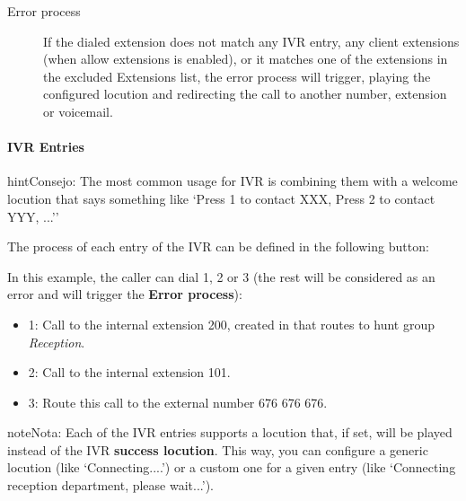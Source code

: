 \documentclass[letterpaper,10pt,spanish]{sphinxmanual}
\begin{document}
\begin{description}
\item[{Error process}] \leavevmode{}\label{administration_portal/client/vpbx/routing_endpoints/ivrs:term-error-process}
If the dialed extension does not match any IVR entry, any client extensions
(when allow extensions is enabled), or it matches one of the extensions in the
excluded Extensions list, the error process will trigger, playing the configured
locution and redirecting the call to another number, extension or voicemail.

\end{description}


\paragraph{IVR Entries}
\label{administration_portal/client/vpbx/routing_endpoints/ivrs:ivr-entries}
\begin{notice}{hint}{Consejo:}
The most common usage for IVR is combining them with a welcome
locution that says something like `Press 1 to contact XXX, Press 2 to
contact YYY, ...''
\end{notice}

The process of each entry of the IVR can be defined in the following button:

In this example, the caller can dial 1, 2 or 3 (the rest will be considered as
an error and will trigger the \textbf{Error process}):
\begin{itemize}
\item {} 
1: Call to the internal extension 200, created in {\hyperref[administration_portal/client/vpbx/routing_endpoints/hunt_groups:huntgroups]{}} that routes to hunt group \emph{Reception}.

\item {} 
2: Call to the internal extension 101.

\item {} 
3: Route this call to the external number 676 676 676.

\end{itemize}

\begin{notice}{note}{Nota:}
Each of the IVR entries supports a locution that, if set,
will be played instead of the IVR \textbf{success locution}. This way, you can
configure a generic locution (like `Connecting....') or a custom one for
a given entry (like `Connecting reception department, please wait...').
\end{notice}
\end{document}

